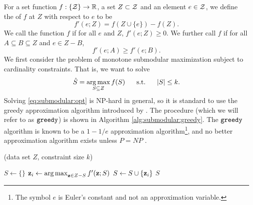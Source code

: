 \documentclass[thesis.tex]{subfiles}
\newcommand{\TO}{{\bfseries to}~}
\newcommand{\greedy}{\mkprocedure{greedy}}
\begin{document}
For a set function $f : \{{\mathcal Z}\} \to \mathbb R$,
a set $Z\subset{\mathcal Z}$ and an element $e\in{\mathcal Z}$,
we define the  of $f$ at $Z$ with respect to $e$ to be
\begin{equation}
    f'(e; Z) = f (Z\cup\{e\}) - f(Z)
    .
\end{equation}
We call the function $f$  if for all $e$ and $Z$, $f'(e;Z) \ge 0$.
We further call $f$  if for all $A \subseteq B \subseteq Z$ and $e\in Z-B$,
\begin{equation}
    f'(e;A)\ge f'(e;B)
    .
\end{equation}
We first consider the problem of monotone submodular maximization subject to cardinality constraints.
That is, we want to solve
\begin{equation}
    \label{eq:submodular:opt}
    \hat S =
    \operatorname*{arg\,max}_{S\subseteq Z} f(S)
    ~~~~~\text{s.t.}~~~~~
    |S|\le k
    .
\end{equation}
Solving \eqref{eq:submodular:opt} is NP-hard in general,
so it is standard to use the greedy approximation algorithm introduced by \citet{nemhauser1978analysis}.
The procedure (which we will refer to as $\greedy$) is shown in Algorithm \ref{alg:submodular:greedy}.
The $\greedy$ algorithm is known to be a $1-1/e$ approximation algorithm\footnote{
The symbol $e$ is Euler's constant and not an approximation variable.},
and no better approximation algorithm exists unless $P=NP$ \citep{krause14survey}.
\begin{algorithm}[t]
    \caption{\greedy(data set $Z$, constraint size $k$)}
    \label{alg:submodular:greedy}
    \vspace{0.1in}
    \begin{algorithmic}[1]
        \State $S \leftarrow \{\}$
        \For {$i = 1$ \TO $k$}
            \State $\mathbf z_i \leftarrow \operatorname*{arg\,max}_{\mathbf z\in Z-S} f'(\mathbf z;S)$
            \State $S \leftarrow S \cup \{\mathbf z_i\}$
        \EndFor
        \State \Return $S$
    \end{algorithmic}
\end{algorithm}
\end{document}
